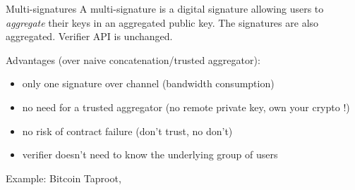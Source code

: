 \documentclass[aspectratio=43]{beamer}
\begin{document}
 
  \begin{frame}{Multi-signatures}
 A multi-signature is a digital signature allowing users to {\it aggregate} their keys in an aggregated public key. The signatures are also aggregated.
  Verifier API is unchanged.
  
  
  {
  Advantages (over naive concatenation/trusted aggregator):
  \begin{itemize}
  \item only one signature over channel (bandwidth consumption)
  \item no need for a trusted aggregator (no remote private key, own your crypto !)
  \item no risk of contract failure (don't trust, no don't)
  \item verifier doesn't need to know the underlying group of users
  \end{itemize}
  Example: Bitcoin Taproot, \href{https://en.bitcoin.it/wiki/BIP_0340}{}
  } 
 
 \end{frame}
 

 
\end{document}
